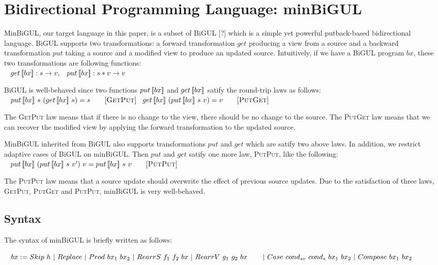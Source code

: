 \section{Bidirectional Programming Language: minBiGUL}

MinBiGUL, our target language in this paper, is a subset of BiGUL [?] which is a simple yet powerful putback-based bidirectional language. BiGUL supports two transformations: a forward transformation $get$ producing a view from a source and a backward transformation $put$ taking a source and a modified view to produce an updated source. Intuitively, if we have a BiGUL program $bx$, these two transformations are following functions:\\
    $\hspace*{3mm} get \, [\![bx]\!] : s \to v,
    \hspace*{3mm} put \, [\![bx]\!] : s * v \to v$

BiGUL is well-behaved since two functions $put \, [\![bx]\!]$ and $get \, [\![bx]\!]$ satify the round-trip laws as follows:\\
    $\tab \putbx{bx}{s}{(\getbx{bx}{s})} = s \qquad [\textsc{GetPut}]\\
    \tab \getbx{bx}{(\putbx{bx}{s}{v})} = v \qquad [\textsc{PutGet}]$

The \textsc{GetPut} law means that if there is no change to the view, there should be no change to the source. The \textsc{PutGet} law means that we can recover the modified view by applying the forward transformation to the updated source.

MinBiGUL inherited from BiGUL also supports transformations $put$ and $get$ which are satify two above laws. In addition, we restrict adaptive cases of BiGUL on minBiGUL. Then $put$ and $get$ satify one more law, \textsc{PutPut}, like the following:\\
    $\hspace*{3mm} put \, [\![bx]\!] \ (put \, [\![bx]\!] \ s \ v') \ v = put \, [\![bx]\!] \ s \ v \qquad [\textsc{PutPut}]$

The \textsc{PutPut} law means that a source update should overwrite the effect of previous source updates. Due to the satisfaction of three laws, \textsc{GetPut}, \textsc{PutGet} and \textsc{PutPut}, minBiGUL is very well-behaved.

\subsection{Syntax}

The syntax of minBiGUL is briefly written as follows:

$\hspace*{3mm} bx := Skip \ h \
        | \ Replace \
        | \ Prod \ bx_1 \ bx_2 \
        | \ RearrS \ f_1 \ f_2 \ bx \
        | \ RearrV \ g_1 \ g_2 \ bx \\
    \hspace*{3mm} \ \quad | \ Case \ cond_{sv} \ cond_{s} \ bx_1 \ bx_2 \
        | \ Compose \ bx_1 \ bx_2$

